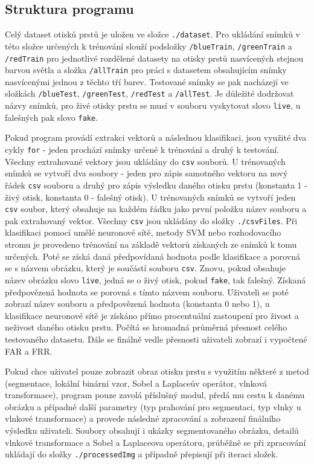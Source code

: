 \subsection{Struktura programu}
Celý dataset otisků prstů je uložen ve složce \verb=./dataset=. Pro ukládání snímků v této složce určených k trénování slouží podsložky \verb=/blueTrain=, \verb=/greenTrain= a \verb=/redTrain= pro jednotlivé rozdělené datasety na otisky prstů nasvícených stejnou barvou světla a složka \verb=/allTrain= pro práci s datasetem obsahujícím snímky nasvícenými jednou z těchto tří barev. Testované snímky se pak nacházejí ve složkách \verb=/blueTest=, \verb=/greenTest=, \verb=/redTest= a \verb=/allTest=. Je důležité dodržovat názvy snímků, pro živé otisky prstu se musí v souboru vyskytovat slovo \verb=live=, u falešných pak slovo \verb=fake=. 

Pokud program provádí extrakci vektorů a následnou klasifikaci, jsou využité dva cykly \verb=for= - jeden prochází snímky určené k trénování a druhý k testování. Všechny extrahované vektory jsou ukládány do \verb=csv= souborů. U trénovaných snímků se vytvoří dva soubory - jeden pro zápis samotného vektoru na nový řádek \verb=csv= souboru a druhý pro zápis výsledku daného otisku prstu (konstanta 1 - živý otisk, konstanta 0 - falešný otisk). U trénovaných snímků se vytvoří jeden \verb=csv= soubor, který obsahuje na každém řádku jako první položku název souboru a pak extrahovaný vektor. Všechny \verb=csv= jsou ukládány do složky \verb=./csvFiles=. Při klasifikaci pomocí umělé neuronové sítě, metody SVM nebo rozhodovacího stromu je provedeno trénování na základě vektorů získaných ze snímků k tomu určených. Poté se získá daná předpovídaná hodnota podle klasifikace a porovná se s názvem obrázku, který je součástí souboru \verb=csv=. Znovu, pokud obsahuje název obrázku slovo \verb=live=, jedná se o živý otisk, pokud \verb=fake=, tak falešný. Získaná předpovězená hodnota se porovná s tímto názvem souboru. Uživateli se poté zobrazí název souboru a předpovězená hodnota (konstanta 0 nebo 1), u klasifikace neuronové sítě je získáno přímo procentuální zastoupení pro živost a neživost daného otisku prstu. Počítá se hromadná průměrná přesnost celého testovaného datasetu. Dále se finálně vedle přesnosti uživateli zobrazí i vypočtené FAR a FRR. 

Pokud chce uživatel pouze zobrazit obraz otisku prstu s využitím některé z metod (segmentace, lokální binární vzor, Sobel a Laplaceův operátor, vlnková transformace), program pouze zavolá příslušný modul, předá mu cestu k danému obrázku a případně další parametry (typ prahování pro segmentaci, typ vlnky u vlnkové transformace) a provede následné zpracování a zobrazení finálního výsledku uživateli. Soubory obsahují i ukázky segmentovaného obrázku, detailů vlnkové transformace a Sobel a Laplaceova operátoru, průběžně se při zpracování ukládají do složky \verb=./processedImg= a případně přepisují při iteraci složek.

